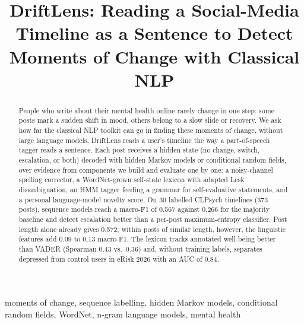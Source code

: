 \documentclass[conference]{IEEEtran}
\begin{document}
\title{DriftLens: Reading a Social-Media Timeline as a Sentence to Detect Moments of Change with Classical NLP}

\author{
\and
{}
\and
{}
}

\maketitle

\begin{abstract}
People who write about their mental health online rarely change in one step: some posts mark a sudden shift in mood, others belong to a slow slide or recovery. We ask how far the classical NLP toolkit can go in finding these moments of change, without large language models. DriftLens reads a user's timeline the way a part-of-speech tagger reads a sentence. Each post receives a hidden state (no change, switch, escalation, or both) decoded with hidden Markov models or conditional random fields, over evidence from components we build and evaluate one by one: a noisy-channel spelling corrector, a WordNet-grown self-state lexicon with adapted Lesk disambiguation, an HMM tagger feeding a grammar for self-evaluative statements, and a personal language-model novelty score. On 30 labelled CLPsych timelines (373 posts), sequence models reach a macro-F1 of 0.567 against 0.266 for the majority baseline and detect escalation better than a per-post maximum-entropy classifier. Post length alone already gives 0.572; within posts of similar length, however, the linguistic features add 0.09 to 0.13 macro-F1. The lexicon tracks annotated well-being better than VADER (Spearman 0.43 vs.\ 0.36) and, without training labels, separates depressed from control users in eRisk 2026 with an AUC of 0.84.
\end{abstract}

\begin{IEEEkeywords}
moments of change, sequence labelling, hidden Markov models, conditional random fields, WordNet, n-gram language models, mental health
\end{IEEEkeywords}
\end{document}
